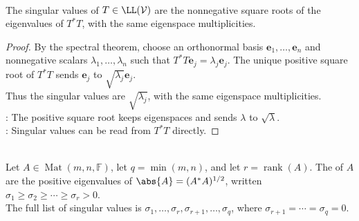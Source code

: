 \begin{proposition} \label{prop:singular-values-from-t-star-t} \\
The singular values of $T\in\LL(\mathcal{V})$ are the nonnegative square roots of the eigenvalues of $T^*T$, with the same eigenspace multiplicities.
\begin{proof}
By the spectral theorem, choose an orthonormal basis $\mathbf{e}_1,\ldots,\mathbf{e}_n$ and nonnegative scalars $\lambda_1,\ldots,\lambda_n$ such that $T^*T\mathbf{e}_j=\lambda_j\mathbf{e}_j$. The unique positive square root of $T^*T$ sends $\mathbf{e}_j$ to $\sqrt{\lambda_j}\mathbf{e}_j$.\\
Thus the singular values are $\sqrt{\lambda_j}$, with the same eigenspace multiplicities.\\
: The positive square root keeps eigenspaces and sends $\lambda$ to $\sqrt{\lambda}$.\\
: Singular values can be read from $T^*T$ directly.
\end{proof}
\end{proposition}

\begin{definition} \label{def:matrix-singular-values} \\
Let $A\in\operatorname{Mat}(m,n,\mathbb{F})$, let $q=\min(m,n)$, and let $r=\operatorname{rank}(A)$. The  of $A$ are the positive eigenvalues of $\abs{A}=(A^*A)^{1/2}$, written $\sigma_1\geq\sigma_2\geq\cdots\geq\sigma_r>0$.\\
The full list of singular values is $\sigma_1,\ldots,\sigma_r,\sigma_{r+1},\ldots,\sigma_q$, where $\sigma_{r+1}=\cdots=\sigma_q=0$.
\end{definition}

